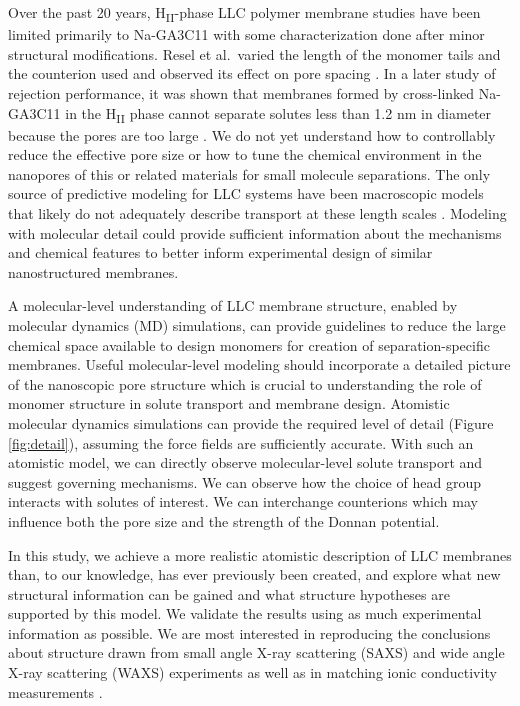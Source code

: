 \documentclass[journal=jpcbfk,manuscript=article]{achemso}
\begin{document}
  Over the past 20 years, H\textsubscript{II}-phase LLC
  polymer membrane studies have been limited primarily to Na-GA3C11 with some
  characterization done after minor structural modifications. Resel et al.~varied
  the length of the monomer tails and the counterion used and observed its effect
  on pore spacing \cite{resel_structural_2000}.  In a later study of rejection
  performance, it was shown that membranes formed by cross-linked Na-GA3C11 in
  the H\textsubscript{II} phase cannot separate solutes less than 1.2 nm in
  diameter because the pores are too large \cite{zhou_supported_2005}. We do not
  yet understand how to controllably reduce the effective pore size or how to
  tune the chemical environment in the nanopores of this or related materials for
  small molecule separations. The only source of predictive modeling for LLC
  systems have been macroscopic models that likely do not adequately describe
  transport at these length scales \cite{hatakeyama_water_2011}. Modeling with
  molecular detail could provide sufficient information about the mechanisms and
  chemical features to better inform experimental design of similar
  nanostructured membranes. 

  A molecular-level understanding of LLC membrane structure, enabled by
  molecular dynamics (MD) simulations, can provide guidelines to reduce the large
  chemical space available to design monomers for creation of separation-specific
  membranes. Useful molecular-level modeling should incorporate a detailed picture of the
  nanoscopic pore structure which is crucial to understanding the role of
  monomer structure in solute transport and membrane design. 
  Atomistic molecular dynamics simulations can provide the required level of detail
  (Figure \ref{fig:detail}), assuming the force fields are sufficiently accurate.
  With such an atomistic model, we can directly observe molecular-level solute
  transport and suggest governing mechanisms. We can observe how the choice of
  head group interacts with solutes of interest. We can interchange
  counterions which may influence both the pore size and the strength of the
  Donnan potential. 

  In this study, we achieve a  more realistic atomistic description of LLC
  membranes than, to our knowledge, has ever previously been created, and explore
  what new structural information can be gained and what structure hypotheses are
  supported by this model. We validate the results using as much experimental
  information as possible. We are most interested in reproducing the conclusions
  about structure drawn from small angle X-ray scattering (SAXS) and wide angle
  X-ray scattering (WAXS) experiments as well as in matching ionic conductivity
  measurements \cite{feng_thin_2016}.
\end{document}
